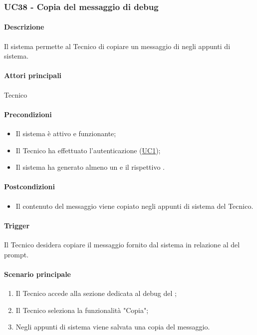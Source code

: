 \subsubsection{UC38 - Copia del messaggio di debug}\label{UC38}

\paragraph*{Descrizione}
Il sistema permette al Tecnico di copiare un messaggio di  negli appunti di sistema.

\paragraph*{Attori principali}
Tecnico

\paragraph*{Precondizioni}
\begin{itemize}
  \item Il sistema è attivo e funzionante;
  \item Il Tecnico ha effettuato l'autenticazione (\hyperref[UC1]{UC1});
  \item Il sistema ha generato almeno un  e il rispettivo .
\end{itemize}

\paragraph*{Postcondizioni}
\begin{itemize}
  \item Il contenuto del messaggio viene copiato negli appunti di sistema del Tecnico.
\end{itemize}

\paragraph*{Trigger}
Il Tecnico desidera copiare il messaggio fornito dal sistema in relazione al  del prompt.

\paragraph*{Scenario principale}
\begin{enumerate}
  \item Il Tecnico accede alla sezione dedicata al debug del ;
  \item Il Tecnico seleziona la funzionalità "Copia";
  \item Negli appunti di sistema viene salvata una copia del messaggio.
\end{enumerate}